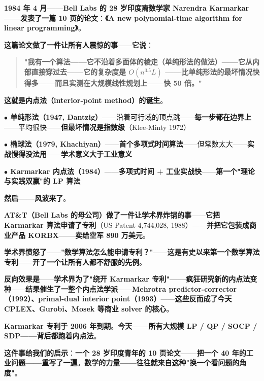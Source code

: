 \begin{tcolorbox}[storybox={\Large 小故事：Karmarkar 算法（1984）与 AT\&T 内点法风波}]
\textbf{1984 年 4 月——Bell Labs 的 28 岁印度裔数学家 Narendra Karmarkar——发表了一篇 10 页的论文}：\textbf{《A new polynomial-time algorithm for linear programming》}。

\medskip

\textbf{这篇论文做了一件让所有人震惊的事}——\textbf{它说}：

\begin{quote}
\textbf{"我有一个算法——它不沿着多面体的棱走（单纯形法的做法）——它\textbf{从内部直接穿过去}——它的复杂度是 $O(n^{3.5}L)$ ——比单纯形法的最坏情况快得多——而且实测在大规模线性规划上——\textbf{快 50 倍}。"}
\end{quote}

\textbf{这就是\textbf{内点法（interior-point method）}的诞生}。

\medskip

\textbf{$\bullet$ 单纯形法（1947, Dantzig）}——沿着可行域的顶点跳——\textbf{每一步都在边界上}——平均很快——\textbf{但最坏情况是指数级}（Klee-Minty 1972）

\textbf{$\bullet$ 椭球法（1979, Khachiyan）}——\textbf{首个多项式时间算法}——但常数太大——\textbf{实战慢得没法用}——\textbf{学术意义大于工业意义}

\textbf{$\bullet$ Karmarkar 内点法（1984）}——\textbf{多项式时间 + 工业实战快}——\textbf{第一个"理论与实践双赢"的 LP 算法}

\medskip

\textbf{然后——风波来了}。

\medskip

\textbf{AT\&T（Bell Labs 的母公司）做了一件让学术界炸锅的事}——\textbf{它把 Karmarkar 算法\textbf{申请了专利}}（US Patent 4,744,028, 1988）——\textbf{并把它包装成商业产品 KORBX——卖给空军 890 万美元}。

\medskip

\textbf{学术界愤怒了}——\textbf{"数学算法怎么能申请专利？"}——\textbf{这是有史以来\textbf{第一个数学算法专利}}——\textbf{开了一个让所有人都不舒服的先例}。

\medskip

\textbf{反向效果是}——\textbf{学术界为了"绕开 Karmarkar 专利"——疯狂研究新的内点法变种}——\textbf{结果催生了\textbf{一整个内点法学派}}——\textbf{Mehrotra predictor-corrector（1992）、primal-dual interior point（1993）}——\textbf{这些反而成了今天 CPLEX、Gurobi、Mosek 等商业 solver 的核心}。

\medskip

\textbf{Karmarkar 专利于 2006 年到期}。\textbf{今天——所有大规模 LP / QP / SOCP / SDP——背后都跑着内点法}。

\medskip

\textbf{这件事给我们的启示}：\textbf{一个 28 岁印度青年的 10 页论文——把一个 40 年的工业问题——重写了一遍}。\textbf{数学的力量——往往就来自这种"换一个看问题的角度"}。
\end{tcolorbox}

